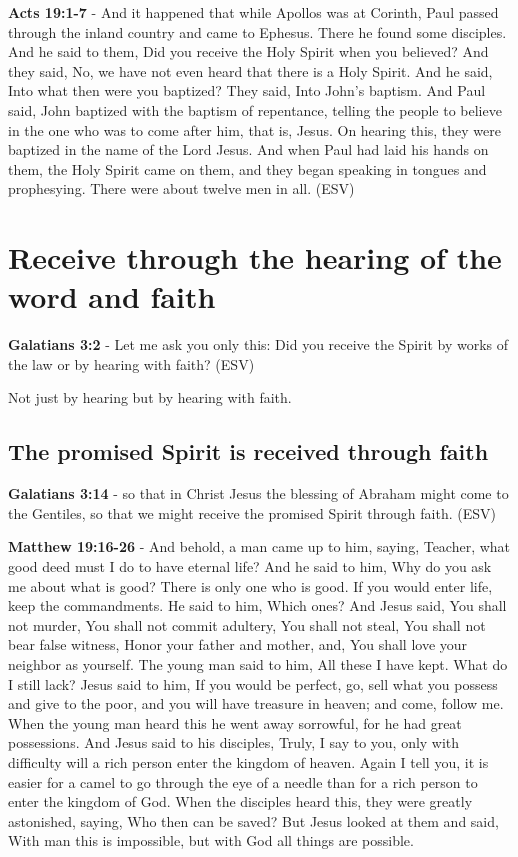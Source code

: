 \documentclass[11pt]{article}
\begin{document}
\textbf{Acts 19:1-7} - And it happened that while Apollos was at Corinth, Paul passed through the inland country and came to Ephesus. There he found some disciples. And he said to them, Did you receive the Holy Spirit when you believed? And they said, No, we have not even heard that there is a Holy Spirit. And he said, Into what then were you baptized? They said, Into John's baptism. And Paul said, John baptized with the baptism of repentance, telling the people to believe in the one who was to come after him, that is, Jesus. On hearing this, they were baptized in the name of the Lord Jesus. And when Paul had laid his hands on them, the Holy Spirit came on them, and they began speaking in tongues and prophesying. There were about twelve men in all. (ESV)

\section{Receive through the hearing of the word and faith}
\label{sec:orgbc232a8}
\textbf{Galatians 3:2} - Let me ask you only this: Did you receive the Spirit by works of the law or by hearing with faith? (ESV)

Not just by hearing but by hearing with faith.

\subsection{The promised Spirit is received through faith}
\label{sec:org9493c71}
\textbf{Galatians 3:14} - so that in Christ Jesus the blessing of Abraham might come to the Gentiles, so that we might receive the promised Spirit through faith. (ESV)

\textbf{Matthew 19:16-26} - And behold, a man came up to him, saying, Teacher, what good deed must I do to have eternal life? And he said to him, Why do you ask me about what is good? There is only one who is good. If you would enter life, keep the commandments. He said to him, Which ones? And Jesus said, You shall not murder, You shall not commit adultery, You shall not steal, You shall not bear false witness, Honor your father and mother, and, You shall love your neighbor as yourself. The young man said to him, All these I have kept. What do I still lack? Jesus said to him, If you would be perfect, go, sell what you possess and give to the poor, and you will have treasure in heaven; and come, follow me. When the young man heard this he went away sorrowful, for he had great possessions. And Jesus said to his disciples, Truly, I say to you, only with difficulty will a rich person enter the kingdom of heaven. Again I tell you, it is easier for a camel to go through the eye of a needle than for a rich person to enter the kingdom of God. When the disciples heard this, they were greatly astonished, saying, Who then can be saved? But Jesus looked at them and said, With man this is impossible, but with God all things are possible.
\end{document}
